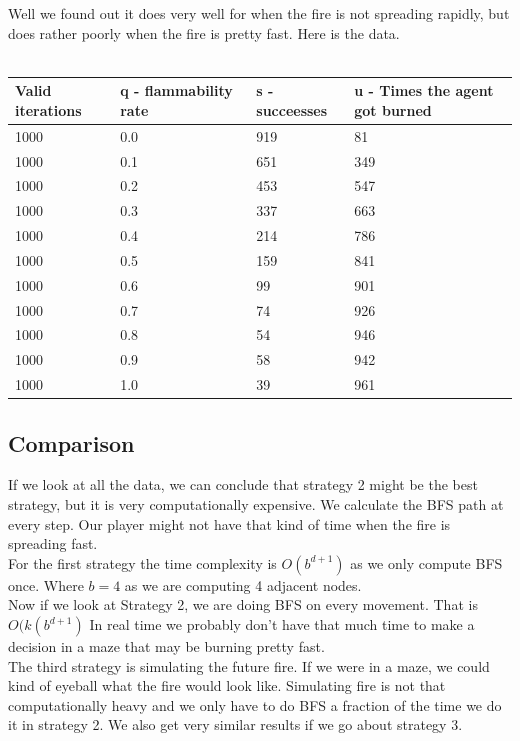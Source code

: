 \documentclass[11pt]{scrartcl} %
\begin{document}
Well we found out it does very well for when the fire is not spreading rapidly, but does rather poorly when the fire is pretty fast. Here is the data.\\
\vspace{2em}\\
\begin{table}[]
\begin{tabular}{|l|l|l|l|}
\hline
\textbf{Valid iterations} & \textbf{q - flammability rate} & \textbf{s - succeesses} & \textbf{u - Times the agent got burned} \\ \hline
1000 & 0.0   & 919 & 81  \\ \hline
1000 & 0.1 & 651 & 349 \\ \hline
1000 & 0.2 & 453 & 547 \\ \hline
1000 & 0.3 & 337 & 663 \\ \hline
1000 & 0.4 & 214 & 786 \\ \hline
1000 & 0.5 & 159 & 841 \\ \hline
1000 & 0.6 & 99  & 901 \\ \hline
1000 & 0.7 & 74  & 926 \\ \hline
1000 & 0.8 & 54  & 946 \\ \hline
1000 & 0.9 & 58  & 942 \\ \hline
1000 & 1.0   & 39  & 961 \\ \hline
\end{tabular}
\end{table}

\subsection{Comparison}
If we look at all the data, we can conclude that strategy 2 might be the best strategy, but it is very computationally expensive. We calculate the BFS path at every step. Our player might not have that kind of time when the fire is spreading fast.\vspace{2em}\\
For the first strategy the time complexity is $O(b^{d+1})$ as we only compute BFS once. Where $b = 4$ as we are computing 4 adjacent nodes.\vspace{2em}\\
Now if we look at Strategy 2, we are doing BFS on every movement. That is $O(k(b^{d+1})$ In real time we probably don't have that much time to make a decision in a maze that may be burning pretty fast.\vspace{2em}\\
The third strategy is simulating the future fire. If we were in a maze, we could kind of eyeball what the fire would look like. Simulating fire is not that computationally heavy and we only have to do BFS a fraction of the time we do it in strategy 2. We also get very similar results if we go about strategy 3. 
\end{document}

